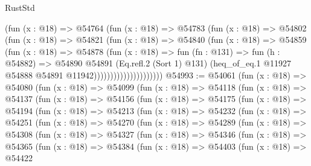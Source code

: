 \begin{lexlean}{RustStd}
\begin{coremodule}
                            (fun (x : @18) =>
                            @54764
                              (fun (x : @18) =>
                              @54783
                                (fun (x : @18) =>
                                @54802
                                  (fun (x : @18) =>
                                  @54821
                                    (fun (x : @18) =>
                                    @54840
                                      (fun (x : @18) =>
                                      @54859
                                        (fun (x : @18) =>
                                        @54878
                                          (fun (x : @18) =>
                                          fun (fn : @131) =>
                                          fun (h : @54882) =>
                                          @54890
                                            @54891
                                            (Eq.refl.{2} (Sort 1) @131)
                                            (heq_of_eq.{1}
                                              @11927
                                              @54888
                                              @54891
                                              @11942)))))))))))))))))))))
@54993 := @54061
    (fun (x : @18) =>
    @54080
      (fun (x : @18) =>
      @54099
        (fun (x : @18) =>
        @54118
          (fun (x : @18) =>
          @54137
            (fun (x : @18) =>
            @54156
              (fun (x : @18) =>
              @54175
                (fun (x : @18) =>
                @54194
                  (fun (x : @18) =>
                  @54213
                    (fun (x : @18) =>
                    @54232
                      (fun (x : @18) =>
                      @54251
                        (fun (x : @18) =>
                        @54270
                          (fun (x : @18) =>
                          @54289
                            (fun (x : @18) =>
                            @54308
                              (fun (x : @18) =>
                              @54327
                                (fun (x : @18) =>
                                @54346
                                  (fun (x : @18) =>
                                  @54365
                                    (fun (x : @18) =>
                                    @54384
                                      (fun (x : @18) =>
                                      @54403
                                        (fun (x : @18) =>
                                        @54422

\end{coremodule}
\end{lexlean}
